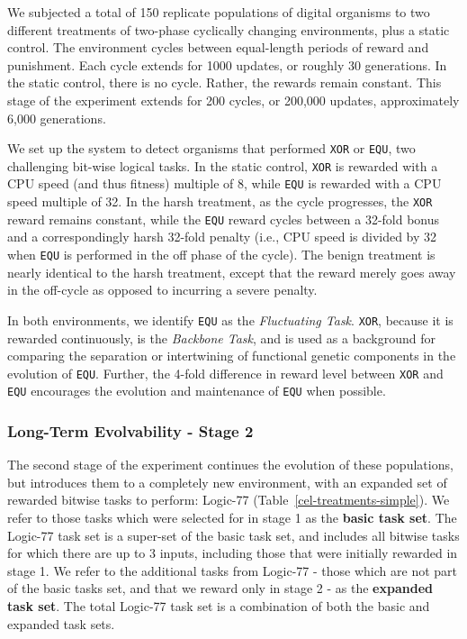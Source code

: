 \documentclass[10pt,letterpaper,final]{article}
\begin{document}
We subjected a total of 150 replicate populations of digital organisms to two different treatments of two-phase cyclically changing environments, plus a static control. The environment cycles between equal-length periods of reward and punishment. Each cycle extends for 1000 updates, or roughly 30 generations. In the static control, there is no cycle. Rather, the rewards remain constant. This stage of the experiment extends for 200 cycles, or 200,000 updates, approximately 6,000 generations.

We set up the system to detect organisms that performed \texttt{XOR} or \texttt{EQU}, two challenging bit-wise logical tasks. In the static control, \texttt{XOR} is rewarded with a CPU speed (and thus fitness) multiple of 8, while \texttt{EQU} is rewarded with a CPU speed multiple of 32. In the harsh treatment, as the cycle progresses, the \texttt{XOR} reward remains constant, while the \texttt{EQU} reward cycles between a 32-fold bonus and a correspondingly harsh 32-fold penalty (i.e., CPU speed is divided by 32 when \texttt{EQU} is performed in the off phase of the cycle). The benign treatment is nearly identical to the harsh treatment, except that the reward merely goes away in the off-cycle as opposed to incurring a severe penalty.

In both environments, we identify \texttt{EQU} as the \textit{Fluctuating Task}. \texttt{XOR}, because it is rewarded continuously, is the \textit{Backbone Task}, and is used as a background for comparing the separation or intertwining of functional genetic components in the evolution of \texttt{EQU}. Further, the 4-fold difference in reward level between \texttt{XOR} and \texttt{EQU} encourages the evolution and maintenance of \texttt{EQU} when possible.

\subsubsection*{Long-Term Evolvability - Stage 2}
The second stage of the experiment continues the evolution of these populations, but introduces them to a completely new environment, with an expanded set of rewarded bitwise tasks to perform: Logic-77 (Table~\ref{cel-treatments-simple}). We refer to those tasks which were selected for in stage 1 as the \textbf{basic task set}. The Logic-77 task set is a super-set of the basic task set, and includes all bitwise tasks for which there are up to 3 inputs, including those that were initially rewarded in stage 1. We refer to the additional tasks from Logic-77 - those which are not part of the basic tasks set, and that we reward only in stage 2 - as the \textbf{expanded task set}. The total Logic-77 task set is a combination of both the basic and expanded task sets.  
\end{document}
